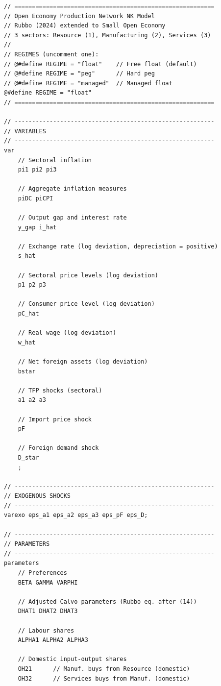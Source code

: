 \documentclass[11pt,a4paper]{article}
\begin{document}
\begin{lstlisting}[caption={Superseded: original hand-linearized draft},label={lst:dynare-old}]
// =========================================================
// Open Economy Production Network NK Model
// Rubbo (2024) extended to Small Open Economy
// 3 sectors: Resource (1), Manufacturing (2), Services (3)
//
// REGIMES (uncomment one):
// @#define REGIME = "float"    // Free float (default)
// @#define REGIME = "peg"      // Hard peg
// @#define REGIME = "managed"  // Managed float
@#define REGIME = "float"
// =========================================================

// ---------------------------------------------------------
// VARIABLES
// ---------------------------------------------------------
var
    // Sectoral inflation
    pi1 pi2 pi3

    // Aggregate inflation measures
    piDC piCPI

    // Output gap and interest rate
    y_gap i_hat

    // Exchange rate (log deviation, depreciation = positive)
    s_hat

    // Sectoral price levels (log deviation)
    p1 p2 p3

    // Consumer price level (log deviation)
    pC_hat

    // Real wage (log deviation)
    w_hat

    // Net foreign assets (log deviation)
    bstar

    // TFP shocks (sectoral)
    a1 a2 a3

    // Import price shock
    pF

    // Foreign demand shock
    D_star
    ;

// ---------------------------------------------------------
// EXOGENOUS SHOCKS
// ---------------------------------------------------------
varexo eps_a1 eps_a2 eps_a3 eps_pF eps_D;

// ---------------------------------------------------------
// PARAMETERS
// ---------------------------------------------------------
parameters
    // Preferences
    BETA GAMMA VARPHI

    // Adjusted Calvo parameters (Rubbo eq. after (14))
    DHAT1 DHAT2 DHAT3

    // Labour shares
    ALPHA1 ALPHA2 ALPHA3

    // Domestic input-output shares
    OH21      // Manuf. buys from Resource (domestic)
    OH32      // Services buys from Manuf. (domestic)


\end{lstlisting}
\end{document}
